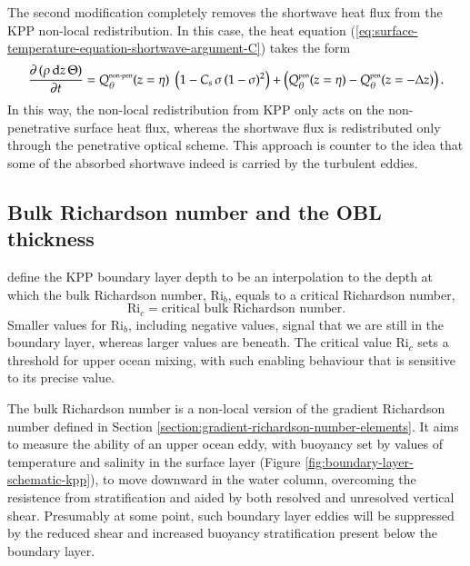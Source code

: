 The second modification completely removes the shortwave heat flux
from the KPP non-local redistribution.  In this case, the heat
equation (\ref{eq:surface-temperature-equation-shortwave-argument-C})
takes the form
\begin{equation}
 \frac{\partial \, (\rho \, \mathrm{d}z \, \Theta)}{\partial t} 
 =     Q_{\theta}^{\mbox{\tiny non-pen}}(z=\eta) \;     \left( 1 - C_{s} \, \sigma \, (1-\sigma)^{2} \right) 
    +  \left( Q_{\theta}^{\mbox{\tiny pen}}(z=\eta) - Q_{\theta}^{\mbox{\tiny pen}}(z=-\Delta z) \right). 
\label{eq:surface-temperature-equation-shortwave-argument-D} 
\end{equation}
In this way, the non-local redistribution from KPP only acts on the
non-penetrative surface heat flux, whereas the shortwave flux is
redistributed only through the penetrative optical scheme.  This
approach is counter to the idea that some of the absorbed shortwave
indeed is carried by the turbulent eddies.


\subsection{Bulk Richardson number and the OBL thickness}
\label{subsection:kpp-obl-thickness}

\cite{LargeKPP} define the KPP boundary layer depth to be an
interpolation to the depth at which the bulk Richardson number,
$\mbox{Ri}_{b}$, equals to a critical Richardson number,
\begin{equation}
 \mbox{Ri}_{c}  = \mbox{critical bulk Richardson number}. 
\label{eq:critical-bulk-richardson-number}
\end{equation}
Smaller values for $\mbox{Ri}_{b}$, including negative values, signal
that we are still in the boundary layer, whereas larger values are
beneath.  The critical value $\mbox{Ri}_{c}$ sets a threshold for
upper ocean mixing, with such enabling behaviour that is sensitive to
its precise value.

The bulk Richardson number is a non-local version of the gradient
Richardson number defined in Section
\ref{section:gradient-richardson-number-elements}.  It aims to measure
the ability of an upper ocean eddy, with buoyancy set by values of
temperature and salinity in the surface layer (Figure
\ref{fig:boundary-layer-schematic-kpp}), to move downward in the water
column, overcoming the resistence from stratification and aided by
both resolved and unresolved vertical shear.  Presumably at some
point, such boundary layer eddies will be suppressed by the reduced
shear and increased buoyancy stratification present below the boundary
layer.

